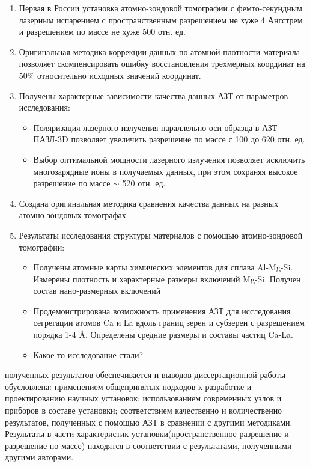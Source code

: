 \clearpage
{}
\begin{enumerate}[beginpenalty=10000] %
  \item Первая в России установка атомно-зондовой томографии с фемто-секундным лазерным испарением с пространственным разрешением не хуже 4 Ангстрем и разрешением по массе не хуже 500 отн. ед.
  \item Оригинальная методика коррекции данных по атомной плотности материала позволяет скомпенсировать ошибку восстановления трехмерных координат на 50\% относительно исходных значений координат.
  \item Получены характерные зависимости качества данных АЗТ от параметров исследования:
  \begin{itemize}
  	\item Поляризация лазерного излучения параллельно оси образца в АЗТ ПАЗЛ-3D позволяет увеличить разрешение по массе с 100 до 620 отн. ед.
  	\item Выбор оптимальной мощности лазерного излучения позволяет исключить многозарядные ионы в получаемых данных, при этом сохраняя высокое разрешение по массе $\sim$ 520 отн. ед.
  	\end{itemize}      
  \item Создана оригинальная методика сравнения качества данных на разных атомно-зондовых томографах
  \item Результаты исследования структуры материалов с помощью атомно-зондовой томографии:
  \begin{itemize}
  	\item Получены атомные карты химических элементов для сплава Al-Mg-Si. Измерены плотность и характерные размеры включений Mg-Si. Получен состав нано-размерных включений
  	\item Продемонстрирована возможность применения АЗТ для исследования сегрегации атомов Ca и La вдоль границ зерен и субзерен с разрешением порядка 1-4 \r{A}. Определены средние размеры и составы частиц Ca-La.  	
  	\item Какое-то исследование стали?
  \end{itemize}
  
  
\end{enumerate}

{\reliability} полученных результатов обеспечивается и выводов диссертационной работы обусловлена: применением общепринятых подходов к разработке и проектированию научных установок; использованием современных узлов и приборов в составе установки; соответствием качественно и количественно результатов, полученных с помощью АЗТ в сравнении с другими методиками. Результаты в части характеристик установки(пространственное разрешение и разрешение по массе) находятся в соответствии с результатами, полученными другими авторами.


